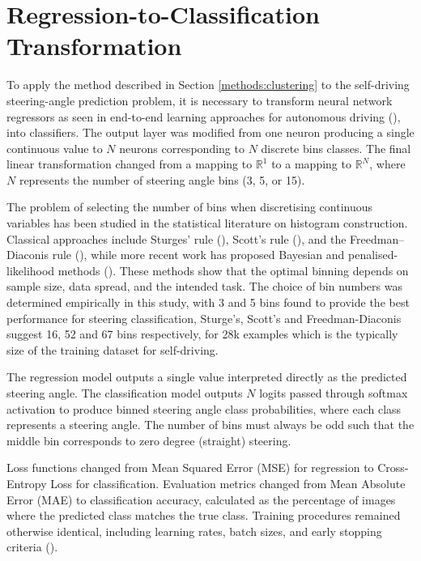 \section{Regression-to-Classification Transformation}
\label{methods:regression_classification}

To apply the method described in Section \ref{methods:clustering} to the self-driving steering-angle prediction problem, it is necessary to transform neural network regressors as seen in end-to-end learning approaches for autonomous driving (\cite{lecun2004dave,bojarski2016end}), into classifiers. The output layer was modified from one neuron producing a single continuous value to $N$ neurons corresponding to $N$ discrete bins classes. The final linear transformation changed from a mapping to $\mathbb{R}^1$ to a mapping to $\mathbb{R}^N$, where $N$ represents the number of steering angle bins (3, 5, or 15). 

The problem of selecting the number of bins when discretising continuous variables has been studied in the statistical literature on histogram construction. Classical approaches include Sturges’ rule (\cite{sturges1926}), Scott’s rule (\cite{scott1979}), and the Freedman–Diaconis rule (\cite{freedman1981}), while more recent work has proposed Bayesian and penalised-likelihood methods (\cite{knuth2006,birge2006}). These methods show that the optimal binning depends on sample size, data spread, and the intended task. The choice of bin numbers was determined empirically in this study, with 3 and 5 bins found to provide the best performance for steering classification, Sturge's, Scott's and Freedman-Diaconis suggest 16, 52 and 67 bins respectively, for 28k examples which is the typically size of the training dataset for self-driving.

The regression model outputs a single value interpreted directly as the predicted steering angle. The classification model outputs $N$ logits passed through softmax activation to produce binned steering angle class probabilities, where each class represents a steering angle. The number of bins must always be odd such that the middle bin corresponds to zero degree (straight) steering.

Loss functions changed from Mean Squared Error (MSE) for regression to Cross-Entropy Loss for classification. Evaluation metrics changed from Mean Absolute Error (MAE) to classification accuracy, calculated as the percentage of images where the predicted class matches the true class. Training procedures remained otherwise identical, including learning rates, batch sizes, and early stopping criteria (\cite{goodfellow2016deep}).




